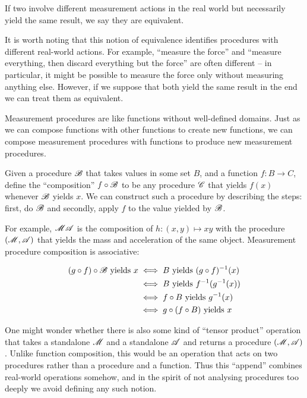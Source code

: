 If two involve different measurement actions in the real world but necessarily yield the same result, we say they are equivalent.

It is worth noting that this notion of equivalence identifies procedures with different real-world actions. For example, ``measure the force'' and ``measure everything, then discard everything but the force'' are often different -- in particular, it might be possible to measure the force only without measuring anything else. However, if we suppose that both yield the same result in the end we can treat them as equivalent. 

Measurement procedures are like functions without well-defined domains. Just as we can compose functions with other functions to create new functions, we can compose measurement procedures with functions to produce new measurement procedures.

\begin{definition}
Given a procedure $\mathscr{B}$ that takes values in some set $B$, and a function $f:B\to C$, define the ``composition'' $f\circ \mathscr{B}$ to be any procedure $\mathscr{C}$ that yields $f(x)$ whenever $\mathscr{B}$ yields $x$. We can construct such a procedure by describing the steps: first, do $\mathscr{B}$ and secondly, apply $f$ to the value yielded by $\mathscr{B}$.
\end{definition}

For example, $\mathscr{MA}$ is the composition of $h:(x,y)\mapsto xy$ with the procedure $(\mathscr{M},\mathscr{A})$ that yields the mass and acceleration of the same object. Measurement procedure composition is associative:

\begin{align}
    (g\circ f)\circ\mathscr{B}\text{ yields } x &\iff B\text{ yields } (g\circ f)^{-1}(x) \\
    &\iff B\text{ yields } f^{-1}(g^{-1}(x))\\
    &\iff f\circ B \text{ yields } g^{-1}(x)\\
    &\iff g\circ(f\circ B)\text{ yields } x
\end{align}

One might wonder whether there is also some kind of ``tensor product'' operation that takes a standalone $\mathscr{M}$ and a standalone $\mathscr{A}$ and returns a procedure $(\mathscr{M},\mathscr{A})$. Unlike function composition, this would be an operation that acts on two procedures rather than a procedure and a function. Thus this ``append'' combines real-world operations somehow, and in the spirit of not analysing procedures too deeply we avoid defining any such notion.

